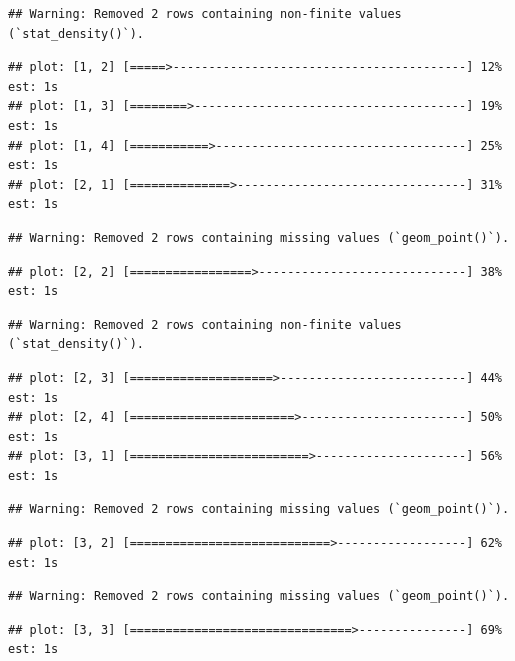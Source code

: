 \documentclass[
]{article}
\begin{document}
\begin{verbatim}
## Warning: Removed 2 rows containing non-finite values (`stat_density()`).
\end{verbatim}

\begin{verbatim}
## plot: [1, 2] [=====>-----------------------------------------] 12% est: 1s
## plot: [1, 3] [========>--------------------------------------] 19% est: 1s
## plot: [1, 4] [===========>-----------------------------------] 25% est: 1s
## plot: [2, 1] [==============>--------------------------------] 31% est: 1s
\end{verbatim}

\begin{verbatim}
## Warning: Removed 2 rows containing missing values (`geom_point()`).
\end{verbatim}

\begin{verbatim}
## plot: [2, 2] [=================>-----------------------------] 38% est: 1s
\end{verbatim}

\begin{verbatim}
## Warning: Removed 2 rows containing non-finite values (`stat_density()`).
\end{verbatim}

\begin{verbatim}
## plot: [2, 3] [====================>--------------------------] 44% est: 1s
## plot: [2, 4] [=======================>-----------------------] 50% est: 1s
## plot: [3, 1] [=========================>---------------------] 56% est: 1s
\end{verbatim}

\begin{verbatim}
## Warning: Removed 2 rows containing missing values (`geom_point()`).
\end{verbatim}

\begin{verbatim}
## plot: [3, 2] [============================>------------------] 62% est: 1s
\end{verbatim}

\begin{verbatim}
## Warning: Removed 2 rows containing missing values (`geom_point()`).
\end{verbatim}

\begin{verbatim}
## plot: [3, 3] [===============================>---------------] 69% est: 1s
\end{verbatim}
\end{document}
